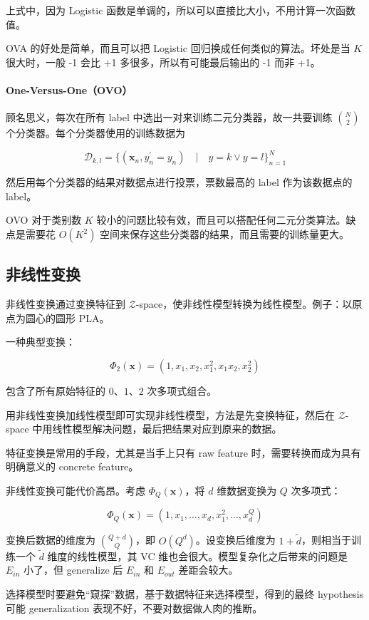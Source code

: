 \documentclass[a4paper]{article}
\begin{document}
上式中，因为 Logistic 函数是单调的，所以可以直接比大小，不用计算一次函数值。

OVA 的好处是简单，而且可以把 Logistic 回归换成任何类似的算法。坏处是当 $K$ 很大时，一般 -1 会比 +1 多很多，所以有可能最后输出的 -1 而非 +1。

\paragraph{One-Versus-One（OVO）} 顾名思义，每次在所有 label 中选出一对来训练二元分类器，故一共要训练 $\displaystyle \binom{N}{2}$ 个分类器。每个分类器使用的训练数据为

$$\mathcal{D}_{k, l} = \{(\mathbf{x}_n, y_n^{\prime}=y_n) \quad | \quad y=k \vee y=l\}_{n=1}^{N}$$

然后用每个分类器的结果对数据点进行投票，票数最高的 label 作为该数据点的 label。

OVO 对于类别数 $K$ 较小的问题比较有效，而且可以搭配任何二元分类算法。缺点是需要花 $O(K^2)$ 空间来保存这些分类器的结果，而且需要的训练量更大。


\subsection{非线性变换}
非线性变换通过变换特征到 $\mathcal{Z}$-space，使非线性模型转换为线性模型。例子：以原点为圆心的圆形 PLA。

一种典型变换：

$$\Phi_2(\mathbf{x}) = (1, x_1, x_2, x_1^2, x_1x_2, x_2^2)$$

包含了所有原始特征的 $0$、$1$、$2$ 次多项式组合。

用非线性变换加线性模型即可实现非线性模型，方法是先变换特征，然后在 $\mathcal{Z}$-space 中用线性模型解决问题，最后把结果对应到原来的数据。

特征变换是常用的手段，尤其是当手上只有 raw feature 时，需要转换而成为具有明确意义的 concrete feature。

非线性变换可能代价高昂。考虑 $\Phi_Q(\mathbf{x})$，将 $d$ 维数据变换为 $Q$ 次多项式：

$$\Phi_Q(\mathbf{x}) = (1, x_1, \dots, x_d, x_1^2, \dots, x_d^Q)$$

变换后数据的维度为 $\displaystyle \binom{Q+d}{Q}$，即 $O(Q^d)$。设变换后维度为 $1 + \tilde{d}$，则相当于训练一个 $\tilde{d}$ 维度的线性模型，其 VC 维也会很大。模型复杂化之后带来的问题是 $E_{in}$ 小了，但 generalize 后 $E_{in}$ 和 $E_{out}$ 差距会较大。

选择模型时要避免“窥探”数据，基于数据特征来选择模型，得到的最终 hypothesis 可能 generalization 表现不好，不要对数据做人肉的推断。
\end{document}
